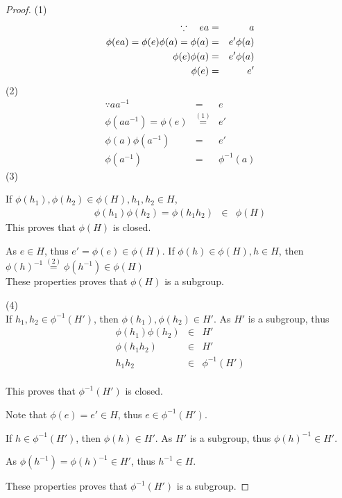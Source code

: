 \documentclass{article}
\theoremstyle{MyNonumberplain}
\theoremstyle{break}
\newtheorem*{proof}{Proof. }
\newcommand{\p}{\phi}
\newcommand{\xequal}[1]{\stackrel{#1}{=}}
\theoremstyle{break}
\theoremstyle{break}
\theoremstyle{definition}
\theoremstyle{break}
\begin{document}
\begin{thmbox}
    \begin{prfbox}
        \begin{proof}
            (1)
            \begin{eqnarray*}
            \because \text{\quad} e a & = & a\\
            \p (e a) = \p (e) \p (a) = \p (a) & = & e' \p (a)\\
            \p (e) \p (a) & = & e' \p (a)\\
            \p (e) & = & e'
            \end{eqnarray*}
            (2)
            \begin{eqnarray*}
            \because a a^{- 1} & = & e\\
            \p (a a^{- 1}) = \p (e) & \xequal{(1)} & e'\\
            \p (a) \p (a^{- 1}) & = & e'\\
            \p (a^{- 1}) & = & \p^{- 1} (a)
            \end{eqnarray*}
            (3)

            If $\p (h_1), \p (h_2) \in \p (H), h_1, h_2 \in H$,
            \begin{eqnarray*}
            \p (h_1) \p (h_2) = \p (h_1 h_2) & \in & \p (H)
            \end{eqnarray*}
            This proves that $\p (H)$ is closed.\bigskip

            As $e \in H$, thus $e' = \p (e) \in \p (H)$. If $\p (h) \in \p (H), h \in H$,
            then $\p (h)^{- 1} \xequal{(2)} \p (h^{- 1}) \in \p (H) $\\

            These properties proves that $\p (H)$ is a subgroup.\bigskip

            (4)\\

            If $h_1, h_2 \in \p^{- 1} (H')$, then $\p (h_1), \p (h_2) \in H'$. As $H'$ is
            a subgroup, thus\\
            \begin{eqnarray*}
            \p (h_1) \p (h_2) & \in & H'\\
            \p (h_1 h_2) & \in & H'\\
            h_1 h_2 & \in & \p^{- 1} (H')
            \end{eqnarray*}\\
            This proves that $\p^{- 1} (H')$ is closed.\bigskip

            Note that $\p (e) = e' \in H$, thus $e \in \p^{- 1} (H')$.\bigskip

            If $h \in \p^{- 1} (H')$, then $\p (h) \in H'$. As $H'$ is a subgroup, thus
            $\p (h)^{- 1} \in H'$.\bigskip

            As $\p (h^{- 1}) = \p (h)^{- 1} \in H'$, thus $h^{- 1} \in H$.\bigskip

            These properties proves that $\p^{- 1} (H')$ is a subgroup.
        \end{proof}
    \end{prfbox}
\end{thmbox}
\end{document}
